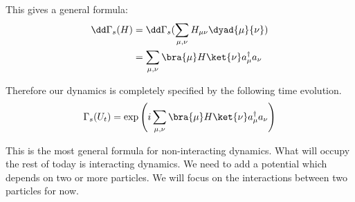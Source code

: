 \documentclass{article}
\begin{document}
This gives a general formula:
\begin{align}
\dd \Gamma_s(H) &= \dd \Gamma_s(\sum_{\mu,\nu}H_{\mu\nu}\dyad{\mu}{\nu})\\
&= \sum_{\mu,\nu}\bra{\mu}H\ket{\nu}a_\mu^\dagger a_\nu
\end{align}

Therefore our dynamics is completely specified by the following time evolution.
\begin{equation}
\Gamma_s(U_t) = \exp\left(i \sum_{\mu,\nu} \bra{\mu}H\ket{\nu}a^\dagger_\mu a_\nu\right)
\end{equation}

This is the most general formula for non-interacting dynamics. What will occupy the rest of today is interacting dynamics. We need to add a potential which depends on two or more particles. We will focus on the interactions between two particles for now.\pagebreak
\end{document}
